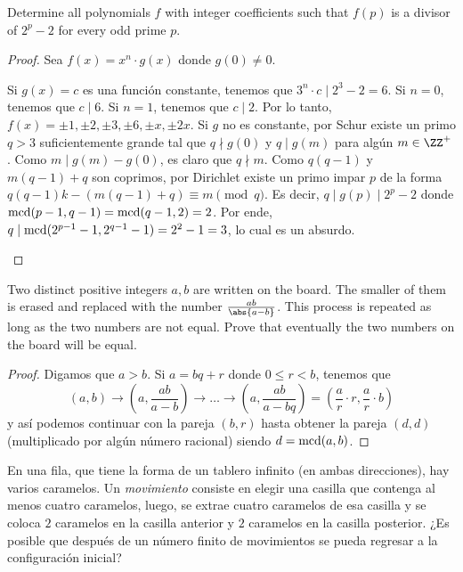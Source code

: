 \begin{probEG}
	Determine all polynomials $f$ with integer coefficients such that $f(p)$ is a divisor of $2^p-2$ for every odd prime $p$.
\end{probEG}

\begin{proof}
	Sea $f(x)=x^n\cdot g(x)$ donde $g(0)\ne 0$.
	\begin{itemize}
		\ii Si $g(x)=c$ es una función constante, tenemos que $3^n\cdot c\mid 2^3-2=6$. Si $n=0$, tenemos que $c\mid 6$. Si $n=1$, tenemos que $c\mid 2$. Por lo tanto, $f(x)=\pm 1,\pm 2,\pm 3,\pm 6,\pm x,\pm 2x$.
		\ii Si $g$ no es constante, por Schur existe un primo $q>3$ suficientemente grande tal que $q\nmid g(0)$ y $q\mid g(m)$ para algún $m\in\ZZ^+$. Como $m\mid g(m)-g(0)$, es claro que $q\nmid m$. Como $q(q-1)$ y $m(q-1)+q$ son coprimos, por Dirichlet existe un primo impar $p$ de la forma $q(q-1)k-(m(q-1)+q)\equiv m\pmod q$. Es decir, $q\mid g(p)\mid 2^p-2$ donde $\operatorname{mcd}(p-1,q-1)=\operatorname{mcd}(q-1,2)=2$. Por ende, $q\mid\operatorname{mcd}(2^{p-1}-1,2^{q-1}-1)=2^2-1=3$, lo cual es un absurdo.
	\end{itemize}
\end{proof}

\begin{probEG}
	Two distinct positive integers $a,b$ are written on the board. The smaller of them is erased and replaced with the number $\frac{ab}{\abs{a-b}}$. This process is repeated as long as the two numbers are not equal. Prove that eventually the two numbers on the board will be equal.
\end{probEG}

\begin{proof}
	Digamos que $a>b$. Si $a=bq+r$ donde $0\le r<b$, tenemos que
	\[(a,b)\to\left(a,\frac{ab}{a-b}\right)\to\dots\to\left(a,\frac{ab}{a-bq}\right)=\left(\frac{a}{r}\cdot r,\frac{a}{r}\cdot b\right)\]
	y así podemos continuar con la pareja $(b,r)$ hasta obtener la pareja $(d,d)$ (multiplicado por algún número racional) siendo $d=\operatorname{mcd}(a,b)$.
\end{proof}

\begin{probEG}
	En una fila, que tiene la forma de un tablero infinito (en ambas direcciones), hay varios caramelos. Un \emph{movimiento} consiste en elegir una casilla que contenga al menos cuatro caramelos, luego, se extrae cuatro caramelos de esa casilla y se coloca $2$ caramelos en la casilla anterior y $2$ caramelos en la casilla posterior. ¿Es posible que después de un número finito de movimientos se pueda regresar a la configuración inicial?
\end{probEG}

